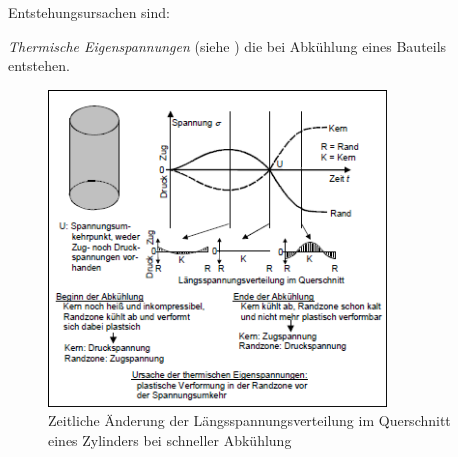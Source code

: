 \documentclass[12pt,a4paper,parskip]{scrartcl}
\begin{document}
{Entstehungsursachen sind:
\begin{itemize*}
\item \emph{Thermische Eigenspannungen} (siehe ) die bei Abkühlung eines Bauteils entstehen.\begin{figure}
  \centering
  \includegraphics[width=0.8\textwidth] {eigenspanabk}
  \caption[Spannungsverteilung eines Zylinders]{Zeitliche Änderung der Längsspannungsverteilung im Querschnitt eines Zylinders bei schneller Abkühlung\protect\footnotemark}
  \label{fig:eigenspanabk}
  \end{figure}


\end{itemize*}}
\end{document}
